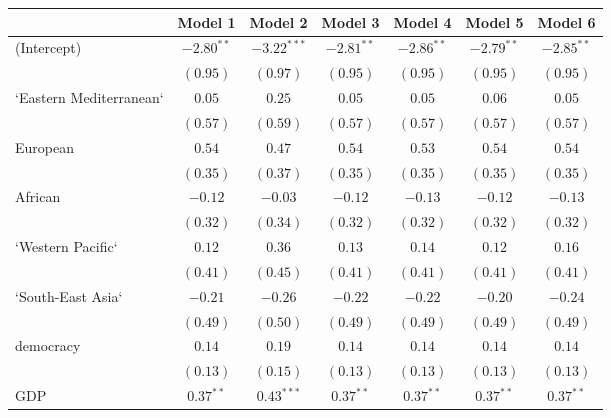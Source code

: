 
\begin{table}[!h]
\begin{center}
\begin{tabular}{l c c c c c c }
\toprule
 & Model 1 & Model 2 & Model 3 & Model 4 & Model 5 & Model 6 \\
\midrule
(Intercept)             & $-2.80^{**}$ & $-3.22^{***}$ & $-2.81^{**}$ & $-2.86^{**}$ & $-2.79^{**}$ & $-2.85^{**}$ \\
                        & $(0.95)$     & $(0.97)$      & $(0.95)$     & $(0.95)$     & $(0.95)$     & $(0.95)$     \\
`Eastern Mediterranean` & $0.05$       & $0.25$        & $0.05$       & $0.05$       & $0.06$       & $0.05$       \\
                        & $(0.57)$     & $(0.59)$      & $(0.57)$     & $(0.57)$     & $(0.57)$     & $(0.57)$     \\
European                & $0.54$       & $0.47$        & $0.54$       & $0.53$       & $0.54$       & $0.54$       \\
                        & $(0.35)$     & $(0.37)$      & $(0.35)$     & $(0.35)$     & $(0.35)$     & $(0.35)$     \\
African                 & $-0.12$      & $-0.03$       & $-0.12$      & $-0.13$      & $-0.12$      & $-0.13$      \\
                        & $(0.32)$     & $(0.34)$      & $(0.32)$     & $(0.32)$     & $(0.32)$     & $(0.32)$     \\
`Western Pacific`       & $0.12$       & $0.36$        & $0.13$       & $0.14$       & $0.12$       & $0.16$       \\
                        & $(0.41)$     & $(0.45)$      & $(0.41)$     & $(0.41)$     & $(0.41)$     & $(0.41)$     \\
`South-East Asia`       & $-0.21$      & $-0.26$       & $-0.22$      & $-0.22$      & $-0.20$      & $-0.24$      \\
                        & $(0.49)$     & $(0.50)$      & $(0.49)$     & $(0.49)$     & $(0.49)$     & $(0.49)$     \\
democracy               & $0.14$       & $0.19$        & $0.14$       & $0.14$       & $0.14$       & $0.14$       \\
                        & $(0.13)$     & $(0.15)$      & $(0.13)$     & $(0.13)$     & $(0.13)$     & $(0.13)$     \\
GDP                     & $0.37^{**}$  & $0.43^{***}$  & $0.37^{**}$  & $0.37^{**}$  & $0.37^{**}$  & $0.37^{**}$  \\

\end{tabular}
\end{center}
\end{table}
